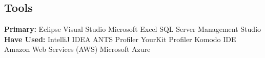 \documentclass[letterpaper]{deedy-resume} %
\begin{document}
\begin{minipage}[t]{0.33\textwidth}
\subsection{Tools}

\textbf{Primary:}\newline 
Eclipse \textbullet{} Visual Studio \textbullet{} Microsoft Excel \newline SQL Server Management Studio \\ 
\textbf{Have Used:}\newline 
IntelliJ IDEA \textbullet{} ANTS Profiler \newline YourKit Profiler \textbullet{} Komodo IDE \newline Amazon Web Services (AWS) \textbullet{} Microsoft Azure\\

\sectionspace %



\end{minipage} %
\hfill
%
%
\end{document}
